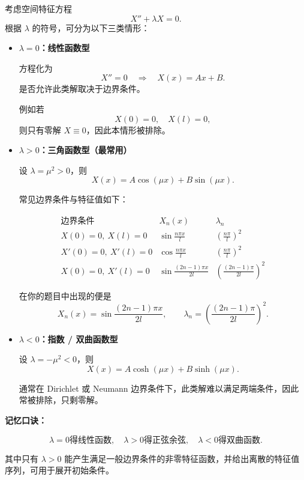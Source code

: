 \begin{theorem}
考虑空间特征方程
\[
X''+\lambda X=0.
\]
根据 $\lambda$ 的符号，可分为以下三类情形：

\begin{itemize}

\item \textbf{$\lambda=0$：线性函数型}

方程化为
\[
X''=0 \quad\Longrightarrow\quad X(x)=Ax+B.
\]
是否允许此类解取决于边界条件。

例如若
\[
X(0)=0,\quad X(l)=0,
\]
则只有零解 $X\equiv 0$，因此本情形被排除。

\item \textbf{$\lambda>0$：三角函数型（最常用）}

设 $\lambda=\mu^{2}>0$，则
\[
X(x)=A\cos(\mu x)+B\sin(\mu x).
\]

常见边界条件与特征值如下：

\[
\begin{array}{c|c|c}
\text{边界条件} & X_n(x) & \lambda_n \\\hline
X(0)=0,\ X(l)=0 &
\displaystyle \sin\frac{n\pi x}{l} &
\displaystyle \left(\frac{n\pi}{l}\right)^{2}
\\[6pt]
X'(0)=0,\ X'(l)=0 &
\displaystyle \cos\frac{n\pi x}{l} &
\displaystyle \left(\frac{n\pi}{l}\right)^{2}
\\[6pt]
X(0)=0,\ X'(l)=0 &
\displaystyle \sin\frac{(2n-1)\pi x}{2l} &
\displaystyle \left(\frac{(2n-1)\pi}{2l}\right)^{2}
\end{array}
\]

在你的题目中出现的便是
\[
X_n(x)=\sin\frac{(2n-1)\pi x}{2l},
\qquad
\lambda_n=\left(\frac{(2n-1)\pi}{2l}\right)^2.
\]

\item \textbf{$\lambda<0$：指数 / 双曲函数型}

设 $\lambda=-\mu^{2}<0$，则
\[
X(x)=A\cosh(\mu x)+B\sinh(\mu x).
\]

通常在 Dirichlet 或 Neumann 边界条件下，此类解难以满足两端条件，因此常被排除，只剩零解。

\end{itemize}

\medskip
\noindent\textbf{记忆口诀：}

\[
\boxed{\lambda=0\text{得线性函数},\quad 
\lambda>0\text{得正弦余弦},\quad
\lambda<0\text{得双曲函数}.}
\]

\medskip
\noindent
其中只有 $\lambda>0$ 能产生满足一般边界条件的非零特征函数，并给出离散的特征值序列，可用于展开初始条件。

\end{theorem}
